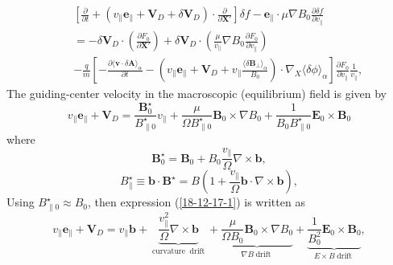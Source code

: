 \documentclass{llncs}
\newcommand{\tmop}[1]{\ensuremath{\operatorname{#1}}}
\begin{document}
\begin{eqnarray}
  &  & \left[ \frac{\partial}{\partial t} + (v_{\parallel}
  \mathbf{e}_{\parallel} +\mathbf{V}_D + \delta \mathbf{V}_D) \cdot
  \frac{\partial}{\partial \mathbf{X}'} \right] \delta f
  -\mathbf{e}_{\parallel} \cdot \mu \nabla B_0 \frac{\partial \delta
  f}{\partial v_{\parallel}} \nonumber\\
  &  & = - \delta \mathbf{V}_D \cdot \left( \frac{\partial F_0}{\partial
  \mathbf{X}'} \right) + \delta \mathbf{V}_D \cdot \left(
  \frac{\mu}{v_{\parallel}} \nabla B_0 \frac{\partial F_0}{\partial
  v_{\parallel}} \right) \nonumber\\
  &  & - \frac{q}{m} \left[ - \frac{\partial \langle \mathbf{v} \cdot \delta
  \mathbf{A} \rangle_{\alpha}}{\partial t} - \left( v_{\parallel}
  \mathbf{e}_{\parallel} +\mathbf{V}_D + v_{\parallel} \frac{\langle \delta
  \mathbf{B}_{\perp} \rangle_{\alpha}}{B_0} \right) \cdot \nabla_X \langle
  \delta \phi \rangle_{\alpha} \right] \frac{\partial F_0}{\partial
  v_{\parallel}}  \frac{1}{v_{\parallel}},  \label{17-5-13-p2m}
\end{eqnarray}
The guiding-center velocity in the macroscopic (equilibrium) field is given by
\begin{equation}
  \label{18-12-17-1} v_{\parallel} \mathbf{e}_{\parallel} +\mathbf{V}_D =
  \frac{\mathbf{B}^{\star}_0}{B^{\star}_{\parallel 0}} v_{\parallel} +
  \frac{\mu}{\Omega B^{\star}_{\parallel 0}} \mathbf{B}_0 \times \nabla B_0 +
  \frac{1}{B_0 B^{\star}_{\parallel 0}} \mathbf{E}_0 \times \mathbf{B}_0
\end{equation}
where
\begin{equation}
  \mathbf{B}^{\star}_0 =\mathbf{B}_0 + B_0 \frac{v_{\parallel}}{\Omega} \nabla
  \times \mathbf{b},
\end{equation}
\begin{equation}
  \label{5-15-p8} B^{\star}_{\parallel} \equiv \mathbf{b} \cdot
  \mathbf{B}^{\star} = B \left( 1 + \frac{v_{\parallel}}{\Omega} \mathbf{b}
  \cdot \nabla \times \mathbf{b} \right),
\end{equation}
Using $B_{\parallel 0}^{\star} \approx B_0$, then expression
(\ref{18-12-17-1}) is written as
\begin{equation}
  v_{\parallel} \mathbf{e}_{\parallel} +\mathbf{V}_D = v_{\parallel}
  \mathbf{b}+ \underbrace{\frac{v_{\parallel}^2}{\Omega} \nabla \times
  \mathbf{b}}_{\tmop{curvature} \tmop{drift}} + \underbrace{\frac{\mu}{\Omega
  B_0} \mathbf{B}_0 \times \nabla B_0}_{\nabla B \tmop{drift}} +
  \underbrace{\frac{1}{B_0^2} \mathbf{E}_0 \times \mathbf{B}_0}_{E \times B
  \tmop{drift}},
\end{equation}
\end{document}
